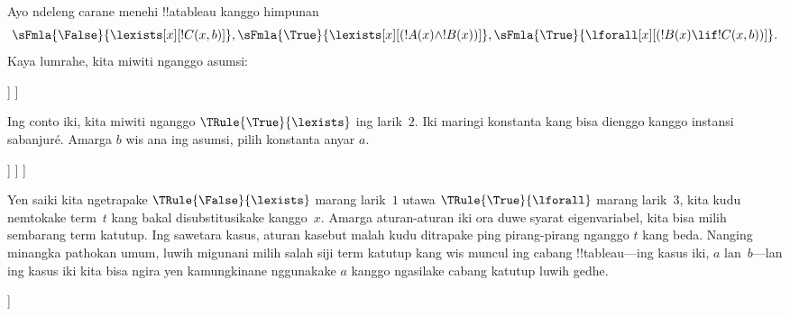 \documentclass[../../../include/open-logic-section]{subfiles}
\begin{document}
\begin{ex}
Ayo ndeleng carane menehi !!a{tableau} kanggo himpunan
\[
\sFmla{\False}{\lexists[x][!C(x,b)]},
\sFmla{\True}{\lexists[x][(!A(x) \land !B(x))]},
\sFmla{\True}{\lforall[x][(!B(x) \lif !C(x,b))]}.
\]
Kaya lumrahe, kita miwiti nganggo asumsi:
\begin{oltableau}
  [\sFmla{\False}{\lexists[x][\formula{C}(x,b)]}, just=\TAss
    [\sFmla{\True}{\lexists[x][(\formula{A}(x) \land \formula{B}(x))]},
      just=\TAss
      [\sFmla{\True}{\lforall[x][(\formula{B}(x) \lif \formula{C}(x,b))]},
        just=\TAss]
    ]
  ]
\end{oltableau}
Ing conto iki, kita miwiti nganggo $\TRule{\True}{\lexists}$ ing larik~$2$.
Iki maringi konstanta kang bisa dienggo kanggo instansi sabanjuré.
Amarga $b$ wis ana ing asumsi, pilih konstanta anyar $a$.
\begin{oltableau}
  [\sFmla{\False}{\lexists[x][\formula{C}(x,b)]}, just=\TAss
    [\sFmla{\True}{\lexists[x][(\formula{A}(x) \land \formula{B}(x))]},
      just=\TAss, checked
      [\sFmla{\True}{\lforall[x][(\formula{B}(x) \lif \formula{C}(x,b))]},
        just=\TAss
        [\sFmla{\True}{\formula{A}(a) \land \formula{B}(a)},
          just={\TRule{\True}{\lexists}[2]}]
      ]
    ]
  ]
\end{oltableau}
Yen saiki kita ngetrapake $\TRule{\False}{\lexists}$ marang larik~$1$
utawa $\TRule{\True}{\lforall}$ marang larik~$3$, kita kudu nemtokake
term~$t$ kang bakal disubstitusikake kanggo~$x$. Amarga aturan-aturan
iki ora duwe syarat eigenvariabel, kita bisa milih sembarang term katutup. Ing
sawetara kasus, aturan kasebut malah kudu ditrapake ping pirang-pirang
nganggo $t$ kang beda. Nanging minangka pathokan umum, luwih migunani
milih salah siji term katutup kang wis muncul ing cabang !!{tableau}---ing kasus iki,
$a$ lan~$b$---lan ing kasus iki kita bisa ngira yen kamungkinane
nggunakake $a$ kanggo ngasilake cabang katutup luwih gedhe.
\begin{oltableau}
  [\sFmla{\False}{\lexists[x][\formula{C}(x,b)]}, just=\TAss
    [\sFmla{\True}{\lexists[x][(\formula{A}(x) \land \formula{B}(x))]},
      just=\TAss, checked
      [\sFmla{\True}{\lforall[x][(\formula{B}(x) \lif \formula{C}(x,b))]}, just=\TAss
        [\sFmla{\True}{\formula{A}(a) \land \formula{B}(a)}, just={\TRule{\True}{\lexists}[2]}
          [\sFmla{\False}{\formula{C}(a,b)}, just={\TRule{\False}{\lexists}[1]}
            [\sFmla{\True}{\formula{B}(a) \lif \formula{C}(a,b)},
              just={\TRule{\True}{\lforall}[3]}
            ]
          ]

\end{oltableau}
\end{ex}
\end{document}
